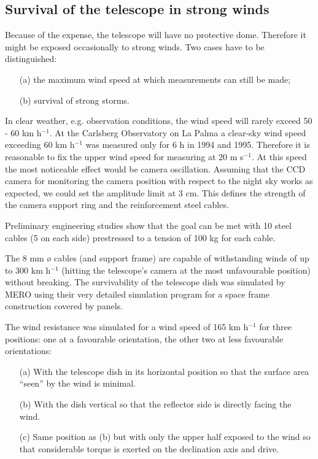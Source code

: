 \subsection{Survival of the telescope in strong winds}


\medskip Because of the expense, the telescope will have no protective dome.
Therefore it might be exposed occasionally to strong winds. Two cases have
to be distinguished:

\begin{itemize}
\item[(a)]  the maximum wind speed at which measurements can still be made;

\item[(b)]  survival of strong storms.
\end{itemize}

In clear weather, e.g. observation conditions, the wind speed will rarely
exceed 50 - 60 km h$^{-1}$. At the Carlsberg Observatory on La Palma a
clear-sky wind speed exceeding 60 km h$^{-1}$ was measured only for 6 h in
1994 and 1995. Therefore it is reasonable to fix the upper wind speed for
measuring at 20 m s$^{-1}$. At this speed the most noticeable effect would
be camera oscillation. Assuming that the CCD camera for monitoring the
camera position with respect to the night sky works as expected, we could
set the amplitude limit at 3 cm. This defines the strength of the camera
support ring and the reinforcement steel cables.

Preliminary engineering studies show that the goal can be met with 10 steel
cables (5 on each side) prestressed to a tension of 100 kg for each cable.

The 8 mm {\o} cables (and support frame) are capable of withstanding
winds of up to 300 km h$^{-1}$ (hitting the telescope's camera at the most
unfavourable position) without breaking. The survivability of the telescope
dish was simulated by MERO using their very detailed simulation program for
a space frame construction covered by panels.

The wind resistance was simulated for a wind speed of 165 km h$^{-1}$ for
three positions: one at a favourable orientation, the other two at less
favourable orientations:

\begin{itemize}
\item[(a)]  With the telescope dish in its horizontal position so that
the surface area ``seen'' by the wind is minimal.

\item[(b)]  With the dish vertical so that the reflector side is directly
facing the wind.

\item[(c)]  Same position as (b) but with only the upper half exposed to the
wind so that considerable torque is exerted on the declination axis and
drive.
\end{itemize}

